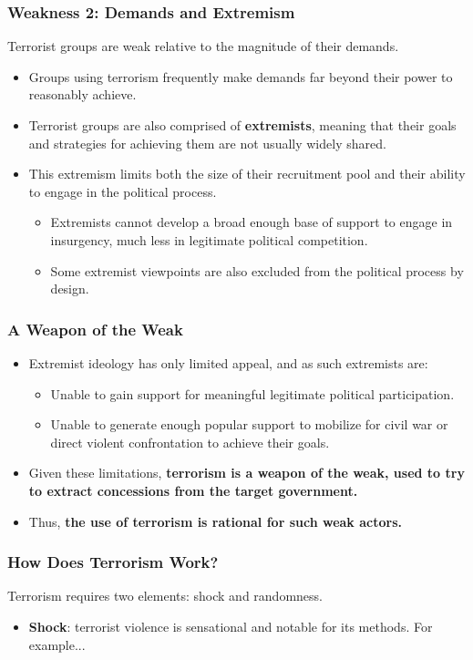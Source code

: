 \documentclass[handout]{beamer}
\begin{document}
\begin{frame} 
\frametitle{\LARGE{Weakness 2: Demands and Extremism}}
Terrorist groups are weak relative to the magnitude of their demands.
\begin{itemize}
		\item Groups using terrorism frequently make demands far beyond their power to reasonably achieve. \pause 
		\item Terrorist groups are also comprised of \textbf{extremists}, meaning that their goals and strategies for achieving them are not usually widely shared. \pause 
		\item This extremism limits both the size of their recruitment pool and their ability to engage in the political process. \pause
		\begin{itemize}
			\item Extremists cannot develop a broad enough base of support to engage in insurgency, much less in legitimate political competition. \pause
			\item Some extremist viewpoints are also excluded from the political process by design.
		\end{itemize} 
\end{itemize}
\end{frame}

\begin{frame} 
	\frametitle{\LARGE{A Weapon of the Weak}}
	\begin{itemize}
		\item Extremist ideology has only limited appeal, and as such extremists are: 
		\begin{itemize}
			\item Unable to gain support for meaningful legitimate political participation. \pause
			\item Unable to generate enough popular support to mobilize for civil war or direct violent confrontation to achieve their goals. \pause
		\end{itemize}
	\item Given these limitations, \textbf{terrorism is a weapon of the weak, used to try to extract concessions from the target government.}
	\item Thus, \textbf{the use of terrorism is rational for such weak actors.}		
	\end{itemize}
\end{frame}

\begin{frame} 
	\frametitle{\LARGE{How Does Terrorism Work?}}
Terrorism requires two elements: shock and randomness.
	\begin{itemize}
		\item \textbf{Shock}: terrorist violence is sensational and notable for its methods. For example...		
	\end{itemize}
\end{frame}
\end{document}
